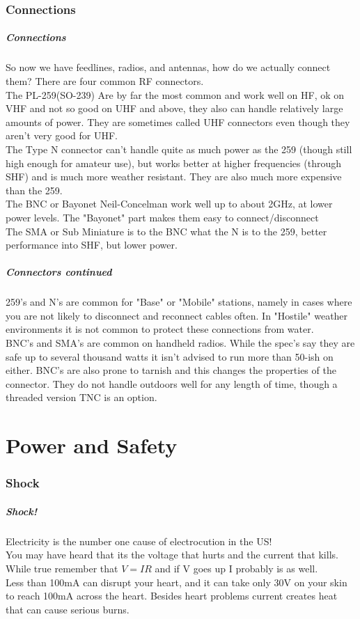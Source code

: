 \documentclass[10pt]{beamer}
\begin{document}
\section{Connections}
\begin{frame}
\frametitle{Connections}
So now we have feedlines, radios, and antennas, how do we actually connect them? There are four common RF connectors.\pause\\
The PL-259(SO-239) Are by far the most common and work well on HF, ok on VHF and not so good on UHF and above, they also can handle relatively large amounts of power. They are sometimes called UHF connectors even though they aren't very good for UHF. \pause \\
The Type N connector can't handle quite as much power as the 259 (though still high enough for amateur use), but works better at higher frequencies (through SHF) and is much more weather resistant. They are also much more expensive than the 259. \pause \\
The BNC or Bayonet Neil-Concelman work well up to about 2GHz, at lower power levels. The "Bayonet" part makes them easy to connect/disconnect \pause \\
The SMA or Sub Miniature is to the BNC what the N is to the 259, better performance into SHF, but lower power.

\end{frame}

\begin{frame}
\frametitle{Connectors continued}
259's and N's are common for "Base" or "Mobile" stations, namely in cases where you are not likely to disconnect and reconnect cables often. In "Hostile" weather environments it is not common to protect these connections from water.\\
BNC's and SMA's are common on handheld radios. While the spec's say they are safe up to several thousand watts it isn't advised to run more than 50-ish on either. BNC's are also prone to tarnish and this changes the properties of the connector. They do not handle outdoors well for any length of time, though a threaded version TNC is an option.
\end{frame}

\part{Power and Safety}
\section{Shock}
\begin{frame}
\frametitle{Shock!}
Electricity is the number one cause of electrocution in the US!\\
You may have heard that its the voltage that hurts and the current that kills. While true remember that $V=IR$ and if V goes up I probably is as well.\\
Less than 100mA can disrupt your heart, and it can take only 30V on your skin to reach 100mA across the heart.
Besides heart problems current creates heat that can cause serious burns.
\end{frame}
\end{document}
